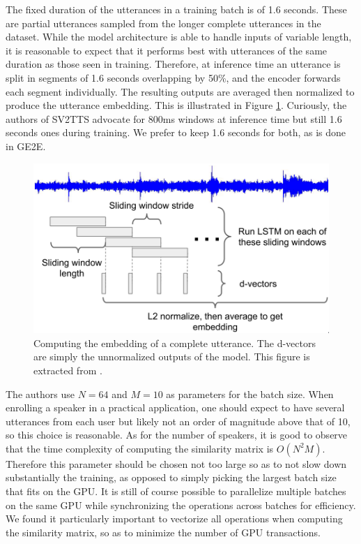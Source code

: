\documentclass[a4paper, oneside, 12pt, english]{article}
\begin{document}
The fixed duration of the utterances in a training batch is of 1.6 seconds. These are partial utterances sampled from the longer complete utterances in the dataset. While the model architecture is able to handle inputs of variable length, it is reasonable to expect that it performs best with utterances of the same duration as those seen in training. Therefore, at inference time an utterance is split in segments of 1.6 seconds overlapping by 50\%, and the encoder forwards each segment individually. The resulting outputs are averaged then normalized to produce the utterance embedding. This is illustrated in Figure \ref{encoder_inference}. Curiously, the authors of SV2TTS advocate for 800ms windows at inference time but still 1.6 seconds ones during training. We prefer to keep 1.6 seconds for both, as is done in GE2E.

\begin{figure}[h]
	\centering
	\includegraphics[width=0.65\linewidth]{images/encoder_inference.png}
	\caption{Computing the embedding of a complete utterance. The d-vectors are simply the unnormalized outputs of the model. This figure is extracted from \citep{GE2E}.}
	\label{encoder_inference}
\end{figure}

The authors use $N = 64$ and $M = 10$ as parameters for the batch size. When enrolling a speaker in a practical application, one should expect to have several utterances from each user but likely not an order of magnitude above that of 10, so this choice is reasonable. As for the number of speakers, it is good to observe that the time complexity of computing the similarity matrix is $O(N^2M)$. Therefore this parameter should be chosen not too large so as to not slow down substantially the training, as opposed to simply picking the largest batch size that fits on the GPU. It is still of course possible to parallelize multiple batches on the same GPU while synchronizing the operations across batches for efficiency. We found it particularly important to vectorize all operations when computing the similarity matrix, so as to minimize the number of GPU transactions.
\end{document}
